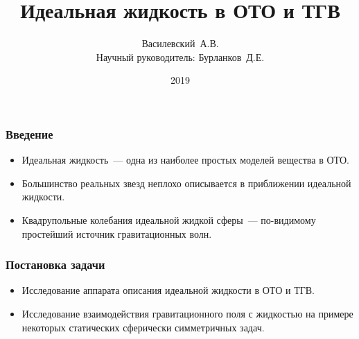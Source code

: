 \documentclass[compress]{beamer}
\title{Идеальная жидкость в ОТО и ТГВ}
\author[Василевский~А.В.]{
    Василевский~А.В. \\[\baselineskip]
    {\footnotesize Научный руководитель: Бурланков~Д.Е.}
}
\institute[ННГУ]{Нижегородский университет им. Н.И.~Лобачевского}
\date{2019}
\begin{document}

    \frame[plain]{\titlepage}


    \begin{frame}\frametitle{Введение}

        \begin{itemize}
            \item Идеальная жидкость~--- одна из наиболее простых моделей вещества в ОТО.
            \item Большинство реальных звезд неплохо описывается в приближении идеальной жидкости.
            \item Квадрупольные колебания идеальной жидкой сферы~--- по-видимому простейший источник гравитационных волн.
        \end{itemize}

    \end{frame}


    \begin{frame}\frametitle{Постановка задачи}

        \begin{itemize}
            \item Исследование аппарата описания идеальной жидкости в ОТО и ТГВ.
            \item Исследование взаимодействия гравитационного поля с жидкостью на примере некоторых статических сферически симметричных задач.
        \end{itemize}

    \end{frame}

\end{document}
